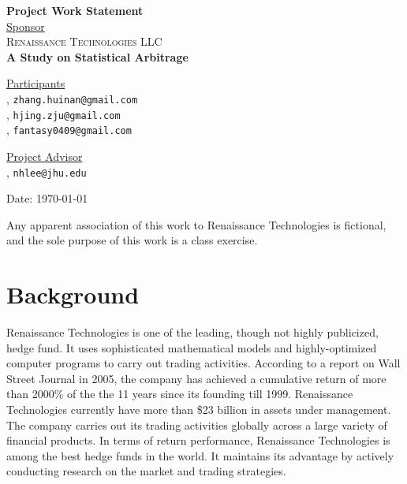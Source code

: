 \documentclass[12pt,letterpaper]{article}
\theoremstyle{definition}
\begin{document}
\def\shiftdowna{0.32in}  %
\def\shiftdownb{0.22in}  %


\begin{center}
\textbf{{\large Project Work Statement}}\\


\vspace \shiftdowna
\underline {Sponsor}\\ 
\vspace{5pt}
\textsc{{\large Renaissance Technologies LLC}}\\


\vspace \shiftdowna
\textbf{{\large A Study on Statistical Arbitrage}}


\vspace{0.35in}
\vspace \shiftdownb
\underline {Participants} \\
\vspace{5pt}
, \texttt{zhang.huinan@gmail.com}\\
, \texttt{hjing.zju@gmail.com}\\
, \texttt{fantasy0409@gmail.com}\\
\vspace{3pt}




\vspace \shiftdownb
\underline {Project Advisor}\\
\vspace{5pt}
, \texttt{nhlee@jhu.edu}

\vspace \shiftdowna
Date: \today

\end{center}

\vfill  
\footnoterule
\noindent \small{Any apparent association of this work to Renaissance
  Technologies is fictional, and the sole purpose of this work is a
  class exercise.}

\newpage

\section{Background} 

Renaissance Technologies is one of the leading, though not highly
publicized, hedge fund. It uses sophisticated mathematical models and
highly-optimized computer programs to carry out trading
activities. According to a report on Wall Street Journal in 2005, the
company has achieved a cumulative return of more than 2000\% of the
the 11 years since its founding till 1999.  Renaissance Technologies
currently have more than \$23 billion in assets under management. The
company carries out its trading activities globally across a large
variety of financial products. In terms of return performance,
Renaissance Technologies is among the best hedge funds in the
world. It maintains its advantage by actively conducting research on
the market and trading strategies.
\end{document}
